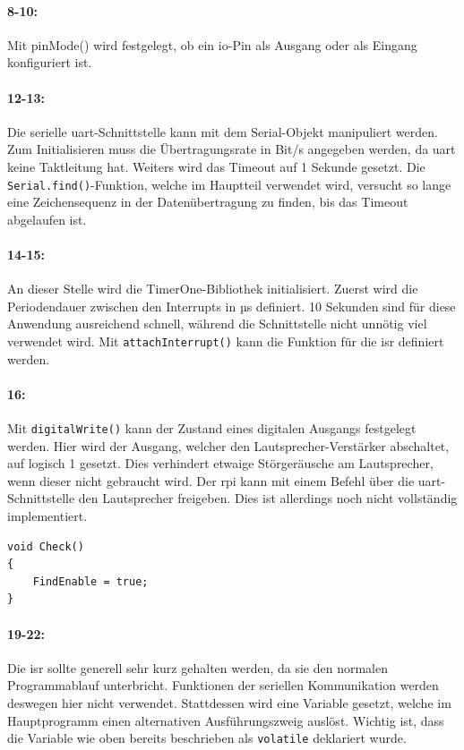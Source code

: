 \paragraph{8-10:}
Mit pinMode() wird festgelegt, ob ein \ac{io}-Pin als Ausgang oder als Eingang konfiguriert ist.

\paragraph{12-13:}
Die serielle \ac{uart}-Schnittstelle kann mit dem Serial-Objekt manipuliert werden.
Zum Initialisieren muss die Übertragungsrate in Bit/s angegeben werden, da \ac{uart} keine Taktleitung hat.
Weiters wird das Timeout auf 1 Sekunde gesetzt.
Die \texttt{Serial.find()}-Funktion, welche im Hauptteil verwendet wird, versucht so lange eine Zeichensequenz in der Datenübertragung zu finden, bis das Timeout abgelaufen ist.

\paragraph{14-15:}
An dieser Stelle wird die TimerOne-Bibliothek initialisiert.
Zuerst wird die Periodendauer zwischen den Interrupts in µs definiert.
10 Sekunden sind für diese Anwendung ausreichend schnell, während die Schnittstelle nicht unnötig viel verwendet wird.
Mit \texttt{attachInterrupt()} kann die Funktion für die \ac{isr} definiert werden.

\paragraph{16:}
Mit \texttt{digitalWrite()} kann der Zustand eines digitalen Ausgangs festgelegt werden.
Hier wird der Ausgang, welcher den Lautsprecher-Verstärker abschaltet, auf logisch 1 gesetzt.
Dies verhindert etwaige Störgeräusche am Lautsprecher, wenn dieser nicht gebraucht wird.
Der \ac{rpi} kann mit einem Befehl über die \ac{uart}-Schnittstelle den Lautsprecher freigeben.
Dies ist allerdings noch nicht vollständig implementiert.

\begin{verbatim}
void Check()
{
    FindEnable = true;
}
\end{verbatim}

\paragraph{19-22:}
Die \ac{isr} sollte generell sehr kurz gehalten werden, da sie den normalen Programmablauf unterbricht.
Funktionen der seriellen Kommunikation werden deswegen hier nicht verwendet.
Stattdessen wird eine Variable gesetzt, welche im Hauptprogramm einen alternativen Ausführungszweig auslöst.
Wichtig ist, dass die Variable wie oben bereits beschrieben als \texttt{volatile} deklariert wurde.

